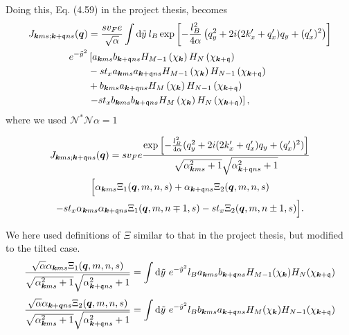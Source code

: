 Doing this, Eq. (4.59)  in the project thesis, becomes
\begin{equation}
  \begin{split}
    J_{\bm{k}ms; \bm{k}+\mathfrak{q} ns}(\bm{q}) &=
    \frac{s v_F e}{\sqrt{\alpha }} \int \mathrm{d}\tilde{y} \: l_B
    \exp \left[
      -\frac{l_{B}^2}{4 \alpha } \left(q_{y}^2 + 2i (2 k' _x + q' _x) q_{y} + (q'_x)^2 \right)
    \right]
   \\
    e^{-\tilde{y}^2}
   &\left[
    a_{\bm{k}ms}b_{\bm{k} + \mathfrak{q} ns}
    H_{M-1} \left(  \chi_{\bm{k}} \right)
    H_N\left( \chi_{\bm{k} + \mathfrak{q}} \right) \right.\\
    &- s t_{x} a_{\bm{k}ms}a_{\bm{k} + \mathfrak{q} ns}
    H_{M-1} \left( \chi_{\bm{k}} \right)
    H_{N-1}\left( \chi_{\bm{k} + \mathfrak{q}} \right)\\
   & +
    b_{\bm{k}ms} a_{\bm{k} + \mathfrak{q} ns}
    H_M \left( \chi_{\bm{k}} \right)
    H_{N-1} \left( \chi_{\bm{k} + \mathfrak{q}} \right)\\
    &\left. - s t_{x}
    b_{\bm{k}ms} b_{\bm{k} + \mathfrak{q} ns}
    H_M \left( \chi_{\bm{k}} \right)
    H_{N} \left(  \chi_{\bm{k} + \mathfrak{q}}\right)
    \right],
  \end{split}
\end{equation}
where we used \( \mathcal{N}^{*}\mathcal{N} \alpha = 1 \)

\begin{multline}
  J_{\bm{k} m s; \bm{k} + \mathfrak{q} n s} (\bm{q}) =
  s v_{F} e
  \frac{
    \exp \left[
      -\frac{l_{B}^2}{4 \alpha } (q_{y}^2 + 2i (2 k'_x + q'_x) q_{y} + (q'_x)^2 )
    \right]
  }{
    \sqrt{\alpha _{\bm{k} m s}^2 + 1} \sqrt{ \alpha _{\bm{k} + \mathfrak{q} n s}^2 + 1 }
  } \\
  \Big[
   \alpha _{\bm{k} m s} \Xi_{1} (\bm{q}, m, n, s)
    + \alpha _{\bm{k} + \mathfrak{q} n s} \Xi _{2} (\bm{q}, m, n, s)\\
    -s t_x \alpha _{\bm{k} m s} \alpha _{\bm{k} + \mathfrak{q} n s} \Xi _1(\bm{q}, m, n\mp 1, s)
    -s t_x \Xi _2(\bm{q}, m, n\pm 1, s)
  \Big].
\end{multline}

We here used definitions of \( \Xi \) similar to that in the project thesis, but modified to the tilted case.
\begin{equation}
  \label{eq:72}
  \frac{ \sqrt{\alpha } \alpha _{\bm{k} m s} \Xi_1 ( \bm{q}, m, n, s )}{
    \sqrt{\alpha _{\bm{k} m s}^2 + 1}
    \sqrt{\alpha _{\bm{k} + \mathfrak{q} n s} ^2 + 1}
  }
  =
  \int \mathrm{d} \tilde{y}
  ~e^{-\tilde{y}^2}
  l_{B}
  a_{\bm{k} m s} b_{\bm{k} + \mathfrak{q} ns}
  H_{M-1} (\chi_{\bm{k}})
  H_N ( \chi _{\bm{k} + \mathfrak{q}} )
\end{equation}
\begin{equation}
  \label{eq:73}
  \frac{ \sqrt{\alpha } \alpha _{\bm{k} + \bm{q} n s} \Xi_2 ( \bm{q}, m, n, s )}{
    \sqrt{\alpha _{\bm{k} m s}^2 + 1}
    \sqrt{\alpha _{\bm{k} + \mathfrak{q} n s} ^2 + 1}
  }
  =
  \int \mathrm{d} \tilde{y}
  ~e^{-\tilde{y}^2}
  l_{B}
  b_{\bm{k} m s} a_{\bm{k} + \mathfrak{q} ns}
  H_{M} (\chi_{\bm{k}})
  H_{N-1} ( \chi _{\bm{k} + \mathfrak{q}} )
\end{equation}

